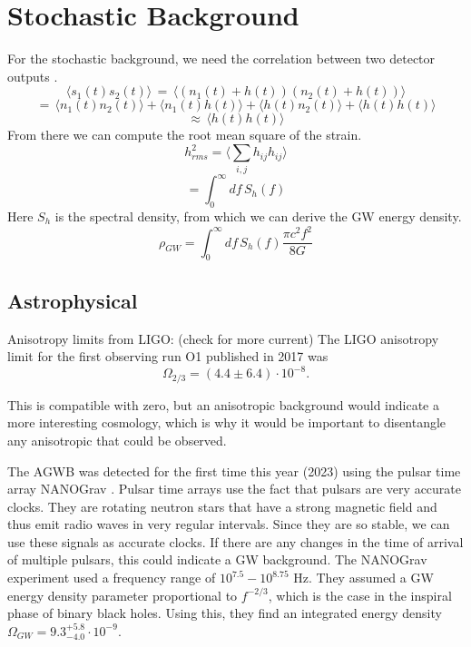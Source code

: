 \section{Stochastic Background}
For the stochastic background, we need the correlation between two detector
outputs \cite{christensen_stochastic_2019}.
\begin{equation}
    \langle s_1 (t) s_2(t)\rangle \, = \, \langle(n_1(t) + h(t))(n_2(t) + h(t))\rangle
\end{equation}
\begin{equation}
    = \, \langle n_1(t) n_2(t)\rangle + \langle n_1(t)h(t)\rangle + \langle h(t)n_2(t)\rangle  + \langle h(t)h(t)\rangle  
\end{equation}
\begin{equation}
    \approx \, \langle h(t)h(t)\rangle 
\end{equation}
From there we can compute the root mean square of the strain.
\begin{equation}
    h_{rms}^2 = \langle \sum_{i,j} h_{ij} h_{ij}\rangle 
\end{equation}
\begin{equation}
    = \int_0^\infty df \, S_h (f)
\end{equation}
Here $S_h$ is the spectral density, from which we can derive the GW energy
density.
\begin{equation}
    \rho_{GW} = \int_0^\infty df \, S_h(f) \frac{\pi c^2 f^2}{8G}
\end{equation} 
\subsection{Astrophysical}


Anisotropy limits from LIGO:
(check for more current)
The LIGO anisotropy limit for the first observing run O1 published in 2017
was 
\begin{equation}
    \Omega_{2/3} = (4.4 \pm 6.4) \cdot 10^{-8} .
\end{equation}

This is compatible with zero, but an anisotropic background would indicate
a more interesting cosmology, which is why it would be important to disentangle
any anisotropic that could be observed.

The AGWB was detected for the first time this year (2023) using the pulsar time array NANOGrav \cite{agazie_nanograv_2023}. Pulsar time arrays use the fact that pulsars are very accurate clocks. They are rotating neutron stars that have a strong magnetic field and thus emit radio waves in very regular intervals. Since they are so stable, we can use these signals as accurate clocks. If there are any changes in the time of arrival of multiple pulsars, this could indicate a GW background. 
The NANOGrav experiment used a frequency range of $10^{7.5} - 10^{8.75}$ Hz. They assumed a GW energy density parameter proportional to $f^{-2/3}$, which is the case in the inspiral phase of binary black holes. \cite{phinney_practical_2001}
Using this, they find an integrated energy density $\Omega_{GW} = 9.3^{+5.8}_{-4.0}\cdot 10^{-9}$.

